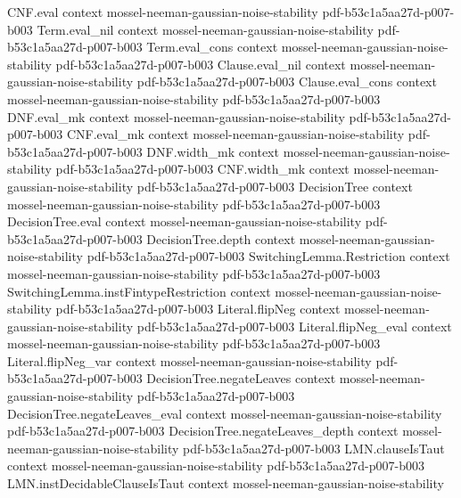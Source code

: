 \begin{theorem}
\proofstep
  {CNF.eval}
  {context}
  {mossel-neeman-gaussian-noise-stability}
  {pdf-b53c1a5aa27d-p007-b003}
\proofstep
  {Term.eval_nil}
  {context}
  {mossel-neeman-gaussian-noise-stability}
  {pdf-b53c1a5aa27d-p007-b003}
\proofstep
  {Term.eval_cons}
  {context}
  {mossel-neeman-gaussian-noise-stability}
  {pdf-b53c1a5aa27d-p007-b003}
\proofstep
  {Clause.eval_nil}
  {context}
  {mossel-neeman-gaussian-noise-stability}
  {pdf-b53c1a5aa27d-p007-b003}
\proofstep
  {Clause.eval_cons}
  {context}
  {mossel-neeman-gaussian-noise-stability}
  {pdf-b53c1a5aa27d-p007-b003}
\proofstep
  {DNF.eval_mk}
  {context}
  {mossel-neeman-gaussian-noise-stability}
  {pdf-b53c1a5aa27d-p007-b003}
\proofstep
  {CNF.eval_mk}
  {context}
  {mossel-neeman-gaussian-noise-stability}
  {pdf-b53c1a5aa27d-p007-b003}
\proofstep
  {DNF.width_mk}
  {context}
  {mossel-neeman-gaussian-noise-stability}
  {pdf-b53c1a5aa27d-p007-b003}
\proofstep
  {CNF.width_mk}
  {context}
  {mossel-neeman-gaussian-noise-stability}
  {pdf-b53c1a5aa27d-p007-b003}
\proofstep
  {DecisionTree}
  {context}
  {mossel-neeman-gaussian-noise-stability}
  {pdf-b53c1a5aa27d-p007-b003}
\proofstep
  {DecisionTree.eval}
  {context}
  {mossel-neeman-gaussian-noise-stability}
  {pdf-b53c1a5aa27d-p007-b003}
\proofstep
  {DecisionTree.depth}
  {context}
  {mossel-neeman-gaussian-noise-stability}
  {pdf-b53c1a5aa27d-p007-b003}
\proofstep
  {SwitchingLemma.Restriction}
  {context}
  {mossel-neeman-gaussian-noise-stability}
  {pdf-b53c1a5aa27d-p007-b003}
\proofstep
  {SwitchingLemma.instFintypeRestriction}
  {context}
  {mossel-neeman-gaussian-noise-stability}
  {pdf-b53c1a5aa27d-p007-b003}
\proofstep
  {Literal.flipNeg}
  {context}
  {mossel-neeman-gaussian-noise-stability}
  {pdf-b53c1a5aa27d-p007-b003}
\proofstep
  {Literal.flipNeg_eval}
  {context}
  {mossel-neeman-gaussian-noise-stability}
  {pdf-b53c1a5aa27d-p007-b003}
\proofstep
  {Literal.flipNeg_var}
  {context}
  {mossel-neeman-gaussian-noise-stability}
  {pdf-b53c1a5aa27d-p007-b003}
\proofstep
  {DecisionTree.negateLeaves}
  {context}
  {mossel-neeman-gaussian-noise-stability}
  {pdf-b53c1a5aa27d-p007-b003}
\proofstep
  {DecisionTree.negateLeaves_eval}
  {context}
  {mossel-neeman-gaussian-noise-stability}
  {pdf-b53c1a5aa27d-p007-b003}
\proofstep
  {DecisionTree.negateLeaves_depth}
  {context}
  {mossel-neeman-gaussian-noise-stability}
  {pdf-b53c1a5aa27d-p007-b003}
\proofstep
  {LMN.clauseIsTaut}
  {context}
  {mossel-neeman-gaussian-noise-stability}
  {pdf-b53c1a5aa27d-p007-b003}
\proofstep
  {LMN.instDecidableClauseIsTaut}
  {context}
  {mossel-neeman-gaussian-noise-stability}

\end{theorem}
